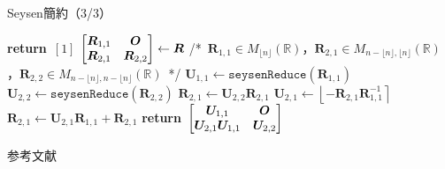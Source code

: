\documentclass[12pt,aspectratio=169,table,dvipdfmx, leqno]{beamer}
\renewcommand{\Comment}[1]{\quad/*~#1~*/}
\newcommand{\round}[1]{\left\lfloor #1 \right\rceil}
\begin{document}
\begin{frame}{Seysen簡約（3/3）}
\begin{algorithm}[H]
    \footnotesize
    \begin{algorithmic}[1]
        \caption{\footnotesize Seysen簡約\cite{DPS25}}
        \label{alg_seysen}
            \State \textbf{return}~$[1]$
        \EndIf
        \State $\mqty[\bm{R}_{1, 1} & \bm{O}\\ \bm{R}_{2, 1} & \bm{R}_{2, 2}]\gets \bm{R}$ \Comment{$\bm{R}_{1, 1}\in M_{\lfloor n\rfloor}(\mathbb{R})$，$\bm{R}_{2, 1}\in M_{n-\lfloor n\rfloor, \lfloor n\rfloor}(\mathbb{R})$，$\bm{R}_{2, 2}\in M_{n-\lfloor n\rfloor, n-\lfloor n\rfloor}(\mathbb{R})$}
        \State $\bm{U}_{1, 1}\gets \texttt{seysenReduce}(\bm{R}_{1, 1})$
        \State $\bm{U}_{2, 2}\gets \texttt{seysenReduce}(\bm{R}_{2, 2})$
        \State $\bm{R}_{2, 1}\gets \bm{U}_{2, 2}\bm{R}_{2, 1}$
        \State $\bm{U}_{2, 1}\gets \round{-\bm{R}_{2, 1}\bm{R}_{1, 1}^{-1}}$
        \State $\bm{R}_{2, 1}\gets \bm{U}_{2, 1}\bm{R}_{1, 1}+\bm{R}_{2, 1}$
        \State \textbf{return}~$\mqty[\bm{U}_{1, 1} & \bm{O}\\ \bm{U}_{2, 1}\bm{U}_{1, 1} & \bm{U}_{2, 2}]$
    \end{algorithmic}
\end{algorithm}
\end{frame}

\begin{frame}[allowframebreaks]{参考文献}
\beamertemplatetextbibitems

\typeout{}

\end{frame}
\end{document}

